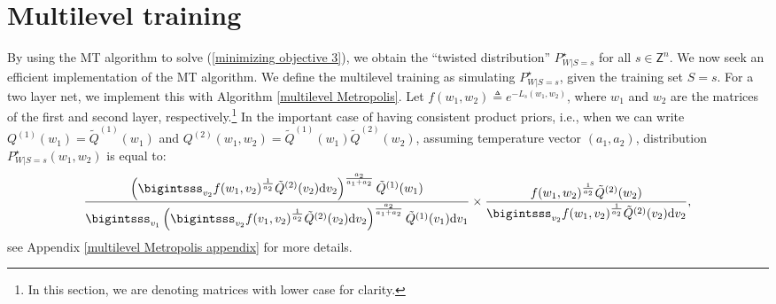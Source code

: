 \documentclass{article}
\newcommand{\Z}[0]{\mathsf{Z}}
\begin{document}
\section{Multilevel training}\label{multilevel training section}
By using the MT algorithm to solve (\ref{minimizing objective 3}), we obtain the ``twisted distribution'' $P^{\star}_{W|S=s}$ for all $s\in \Z^n$. We now seek an efficient implementation of the MT algorithm. We define the multilevel training as simulating $P^{\star}_{W|S=s}$, given the training set $S=s$. 
For a two layer net, we implement this with Algorithm \ref{multilevel Metropolis}.
Let $f(w_1,w_2)\triangleq e^{-L_s(w_1,w_2)}$, where $w_1$ and $w_2$ are the matrices of the first and second layer, respectively.\footnote{In this section, we are denoting matrices with lower case for clarity.} In the important case of having consistent product priors, 
i.e., when we can write $Q^{(1)}(w_1)=\tilde{Q}^{(1)}(w_1)$ and $Q^{(2)}(w_1,w_2)=\tilde{Q}^{(1)}(w_1)\tilde{Q}^{(2)}(w_2)$, assuming temperature vector $(a_1,a_2)$, distribution $P^{\star}_{W|S=s}(w_1,w_2)$ is equal to: 
\begin{equation}\label{twisted distribution simplified}
	\frac{\left(\bigintsss_{v_2}f(w_1,v_2)^{\frac{1}{a_2}} \tilde{Q}^{(2)}(v_2)\mathrm{d}v_2 \right)^{\frac{a_2}{a_1+a_2}}\tilde{Q}^{(1)}(w_1)}{\bigintsss_{v_1}\left(\bigintsss_{v_2}f(v_1,v_2)^{\frac{1}{a_2}}\tilde{Q}^{(2)}(v_2)\mathrm{d}v_2 \right)^{\frac{a_2}{a_1+a_2}}\tilde{Q}^{(1)}(v_1)\mathrm{d}v_1}\times \frac{f(w_1,w_2)^{\frac{1}{a_2}}\tilde{Q}^{(2)}(w_2)}{\bigintsss_{v_2}f(w_1,v_2)^{\frac{1}{a_2}}\tilde{Q}^{(2)}(v_2)\mathrm{d}v_2},
\end{equation}
see Appendix \ref{multilevel Metropolis appendix} for more details.
\end{document}
